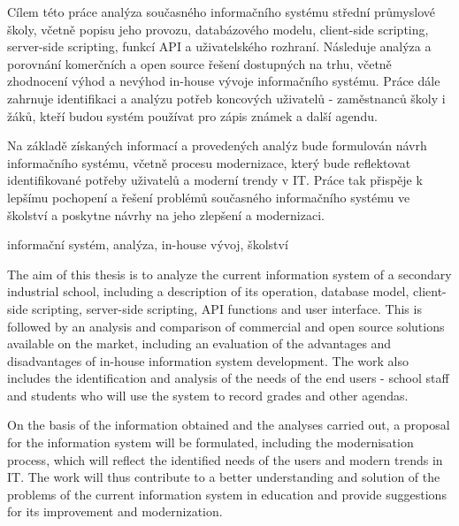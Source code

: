 \documentclass[FM,Proj]{tulthesis}
\begin{document}

\begin{abstractCZ}
Cílem této práce analýza současného informačního systému střední průmyslové školy, včetně popisu jeho provozu, databázového modelu, client-side scripting, server-side scripting, funkcí API a uživatelského rozhraní. Následuje analýza a porovnání komerčních a open source řešení dostupných na trhu, včetně zhodnocení výhod a nevýhod in-house vývoje informačního systému. Práce dále zahrnuje identifikaci a analýzu potřeb koncových uživatelů - zaměstnanců školy i žáků, kteří budou systém používat pro zápis známek a další agendu.

Na základě získaných informací a provedených analýz bude formulován návrh informačního systému, včetně procesu modernizace, který bude reflektovat identifikované potřeby uživatelů a moderní trendy v IT. Práce tak přispěje k lepšímu pochopení a řešení problémů současného informačního systému ve školství a poskytne návrhy na jeho zlepšení a modernizaci.
\end{abstractCZ}

\begin{keywordsCZ}
informační systém, analýza, in-house vývoj, školství
\end{keywordsCZ}

\vspace{2cm}

\begin{abstractEN}
The aim of this thesis is to analyze the current information system of a secondary industrial school, including a description of its operation, database model, client-side scripting, server-side scripting, API functions and user interface. This is followed by an analysis and comparison of commercial and open source solutions available on the market, including an evaluation of the advantages and disadvantages of in-house information system development. The work also includes the identification and analysis of the needs of the end users - school staff and students who will use the system to record grades and other agendas.

On the basis of the information obtained and the analyses carried out, a proposal for the information system will be formulated, including the modernisation process, which will reflect the identified needs of the users and modern trends in IT. The work will thus contribute to a better understanding and solution of the problems of the current information system in education and provide suggestions for its improvement and modernization.
\end{abstractEN}
\end{document}
